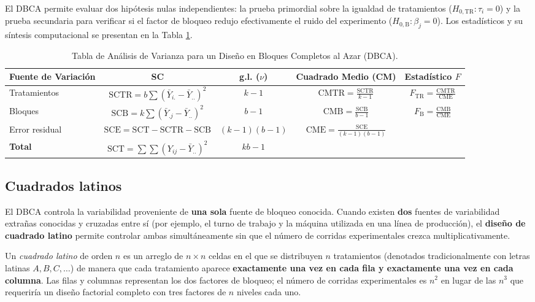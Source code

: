 El DBCA permite evaluar dos hipótesis nulas independientes: la prueba primordial sobre la igualdad de tratamientos ($H_{0,\text{TR}}: \tau_i = 0$) y la prueba secundaria para verificar si el factor de bloqueo redujo efectivamente el ruido del experimento ($H_{0,\text{B}}: \beta_j = 0$). Los estadísticos y su síntesis computacional se presentan en la Tabla \ref{tab:anova_dbca}.

\begin{table}[h!]
	\centering
	\begin{tabular}{lcccc}
		\hline
		\textbf{Fuente de Variación} & \textbf{SC} & \textbf{g.l. ($\nu$)} & \textbf{Cuadrado Medio (CM)} & \textbf{Estadístico $F$} \\ \hline
		Tratamientos & $\text{SCTR} = b \sum (\bar{Y}_{i.} - \bar{Y}_{..})^2$ & $k - 1$ & $\text{CMTR} = \frac{\text{SCTR}}{k - 1}$ & $F_{\text{TR}} = \frac{\text{CMTR}}{\text{CME}}$ \\ [1.5ex]
		Bloques & $\text{SCB} = k \sum (\bar{Y}_{.j} - \bar{Y}_{..})^2$ & $b - 1$ & $\text{CMB} = \frac{\text{SCB}}{b - 1}$ & $F_{\text{B}} = \frac{\text{CMB}}{\text{CME}}$ \\ [1.5ex]
		Error residual & $\text{SCE} = \text{SCT} - \text{SCTR} - \text{SCB}$ & $(k-1)(b-1)$ & $\text{CME} = \frac{\text{SCE}}{(k-1)(b-1)}$ & \\ [1.5ex] \hline
		\textbf{Total} & $\text{SCT} = \sum \sum (Y_{ij} - \bar{Y}_{..})^2$ & $kb - 1$ & & \\ \hline
	\end{tabular}
	\caption{Tabla de Análisis de Varianza para un Diseño en Bloques Completos al Azar (DBCA).}
	\label{tab:anova_dbca}
\end{table}

\subsection{Cuadrados latinos}

El DBCA controla la variabilidad proveniente de \textbf{una sola} fuente de bloqueo conocida. Cuando existen \textbf{dos} fuentes de variabilidad extrañas conocidas y cruzadas entre sí (por ejemplo, el turno de trabajo y la máquina utilizada en una línea de producción), el \textbf{diseño de cuadrado latino} permite controlar ambas simultáneamente sin que el número de corridas experimentales crezca multiplicativamente.

\begin{definicion}
	Un \emph{cuadrado latino} de orden $n$ es un arreglo de $n \times n$ celdas en el que se distribuyen $n$ tratamientos (denotados tradicionalmente con letras latinas $A, B, C, \ldots$) de manera que cada tratamiento aparece \textbf{exactamente una vez en cada fila y exactamente una vez en cada columna}. Las filas y columnas representan los dos factores de bloqueo; el número de corridas experimentales es $n^2$ en lugar de las $n^3$ que requeriría un diseño factorial completo con tres factores de $n$ niveles cada uno.
\end{definicion}

